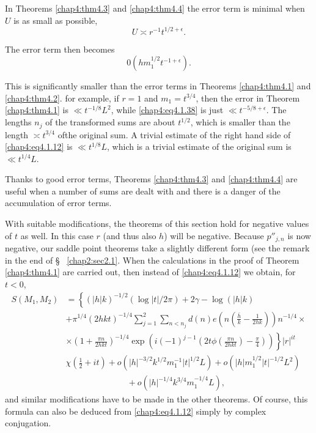 \begin{Remark}\label{chap4:rem2}
In Theorems \ref{chap4:thm4.3} and \ref{chap4:thm4.4} the error term
is minimal when $U$ is as small as possible, \ie 
\begin{equation}\label{chap4:eq4.1.37}
  U\asymp r^{-1}t^{1/2+\epsilon}.
\end{equation}

The error term then becomes
\begin{equation}\label{chap4:eq4.1.38}
  0\left(hm_1^{1/2}t^{-1+\epsilon}\right).
\end{equation}

This is significantly smaller than the error terms in Theorems
\ref{chap4:thm4.1} and \ref{chap4:thm4.2}. for example, if $r=1$ and
$m_1=t^{3/4}$, then the error in Theorem \ref{chap4:thm4.1} is $\ll
t^{-1/8}L^2$, while \eqref{chap4:eq4.1.38} is just $\ll
t^{-5/8+\epsilon}$. The lengths $n_j$ of the transformed sums are
about $t^{1/2}$, which is smaller than the length $\asymp t^{3/4}$
of\pageoriginale the original sum. A trivial estimate of the right
hand side of \eqref{chap4:eq4.1.12} is $\ll t^{1/8}L$, which is a
trivial estimate of the original sum is $\ll t^{1/4}L$.  

Thanks to good error terms, Theorems \ref{chap4:thm4.3} and \ref{chap4:thm4.4} are useful when a number of sums are dealt with and there is a danger of the accumulation of error terms.
\end{Remark}

\begin{Remark}\label{chap4:rem3}
With suitable modifications, the theorems of this section hold for
negative values of $t$ as well. In this case $r$ (and thus also $h$)
will be negative. Because $p''_{j,n}$ is now negative, our saddle
point theorems take a slightly different form (see the remark in the
end of \S~ \ref{chap2:sec2.1}. When the calculations in the proof of
Theorem \ref{chap4:thm4.1} are carried out, then instead of
\eqref{chap4:eq4.1.12} we obtain, for $t<0$, 
\begin{align*}
S\left(M_1,M_2\right) &=
\left\{(|h|k)^{-1/2}(\log|t|/2\pi)+2\gamma-\log (|h|k)\right.\\ 
& +\pi^{1/4}(2hkt)^{-1/4}\sum\limits_{j=1}^2\sum\limits_{n<n_j}d(n)
e\left(n\left(\frac{\bar{h}}{k}-\frac{1}{2hk}\right)\right)n^{-1/4}\times\\ 
& \times \left.\left(1+\frac{\pi
  n}{2hkt}\right)^{-1/4}\exp\left(i(-1)^{j-1}
\left(2t\phi\left(\frac{\pi
  n}{2hkt}\right)-\frac{\pi}{4}\right)\right)\right\}|r|^{it}\\
&\chi\left(
\frac{1}{2}+it\right)+o\left(|h|^{-3/2}k^{1/2}m_1^{-1}|t|^{1/2}L\right)
+ o\left(|h|m_1^{1/2}|t|^{-1/2}L^2\right)\\
& \hspace{3cm}+o\left(|h|^{-1/4}k^{3/4}m_1^{-1/4}L\right),
\end{align*}
and similar modifications have to be made in the other theorems. Of
course, this formula can also be deduced from \eqref{chap4:eq4.1.12}
simply by complex conjugation.  
\end{Remark}

